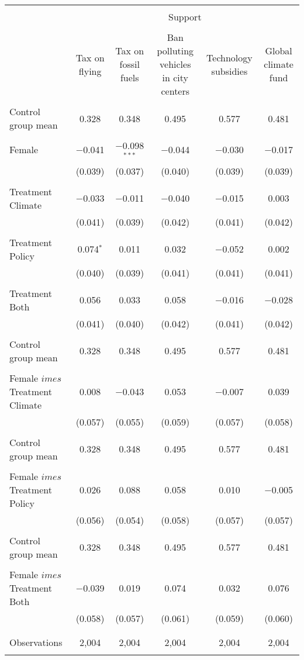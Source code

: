 
\begin{tabular}{@{\extracolsep{5pt}}lccccc} 
\\[-1.8ex]\hline 
\hline \\[-1.8ex] 
 & \multicolumn{5}{c}{Support} \\ 
\cline{2-6} 
\\[-1.8ex] & Tax on flying & Tax on fossil fuels & Ban polluting vehicles in city centers & Technology subsidies & Global climate fund \\ 
\hline \\[-1.8ex] 
 Control group mean & 0.328 & 0.348 & 0.495 & 0.577 & 0.481  \\ \hline \\[-1.8ex] Female & $-$0.041 & $-$0.098$^{***}$ & $-$0.044 & $-$0.030 & $-$0.017 \\ 
  & (0.039) & (0.037) & (0.040) & (0.039) & (0.039) \\ 
  & & & & & \\ 
 Treatment Climate & $-$0.033 & $-$0.011 & $-$0.040 & $-$0.015 & 0.003 \\ 
  & (0.041) & (0.039) & (0.042) & (0.041) & (0.042) \\ 
  & & & & & \\ 
 Treatment Policy & 0.074$^{*}$ & 0.011 & 0.032 & $-$0.052 & 0.002 \\ 
  & (0.040) & (0.039) & (0.041) & (0.041) & (0.041) \\ 
  & & & & & \\ 
 Treatment Both & 0.056 & 0.033 & 0.058 & $-$0.016 & $-$0.028 \\ 
  & (0.041) & (0.040) & (0.042) & (0.041) & (0.042) \\ 
  & & & & & \\ 
 Control group mean & 0.328 & 0.348 & 0.495 & 0.577 & 0.481  \\ \hline \\[-1.8ex] Female $	imes$ Treatment Climate & 0.008 & $-$0.043 & 0.053 & $-$0.007 & 0.039 \\ 
  & (0.057) & (0.055) & (0.059) & (0.057) & (0.058) \\ 
  & & & & & \\ 
 Control group mean & 0.328 & 0.348 & 0.495 & 0.577 & 0.481  \\ \hline \\[-1.8ex] Female $	imes$ Treatment Policy & 0.026 & 0.088 & 0.058 & 0.010 & $-$0.005 \\ 
  & (0.056) & (0.054) & (0.058) & (0.057) & (0.057) \\ 
  & & & & & \\ 
 Control group mean & 0.328 & 0.348 & 0.495 & 0.577 & 0.481  \\ \hline \\[-1.8ex] Female $	imes$ Treatment Both & $-$0.039 & 0.019 & 0.074 & 0.032 & 0.076 \\ 
  & (0.058) & (0.057) & (0.061) & (0.059) & (0.060) \\ 
  & & & & & \\ 
\hline \\[-1.8ex] 

Observations & 2,004 & 2,004 & 2,004 & 2,004 & 2,004 \\ 
\hline 
\hline \\[-1.8ex] 
\end{tabular} 